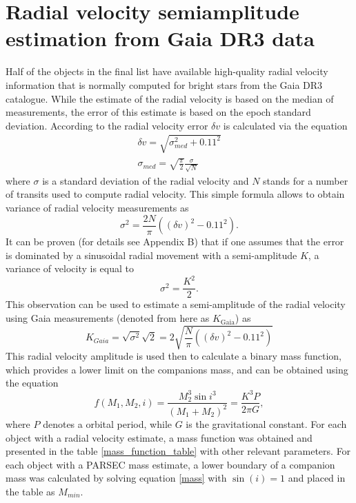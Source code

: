 \documentclass{pracalicmgr}
\begin{document}
\section{Radial velocity semiamplitude estimation from Gaia DR3 data}
Half of the objects in the final list have available high-quality radial velocity information that is normally computed for bright stars from the Gaia DR3 catalogue.
While the estimate of the radial velocity is based on the median of measurements, 
the error of this estimate is based on the epoch standard deviation. According to \citet{katz_gaia_2022} the radial velocity error $\delta v$ 
is calculated via the equation
\begin{align}
    \delta v=\sqrt{\sigma_{med}^2+0.11^2}\\
    \sigma_{med}=\sqrt{\frac{\pi}{2}}\frac{\sigma}{\sqrt{N}}
\end{align}
where $\sigma$ is a standard deviation of the radial velocity and $N$ stands for a number of transits used to compute radial velocity. This simple formula allows to obtain variance of 
radial velocity measurements as 
\begin{equation}
    \sigma^2=\frac{2N}{\pi}\left((\delta v)^2-0.11^2\right).
\end{equation}
It can be proven (for details see Appendix B) that if one assumes that the error is dominated by a sinusoidal radial movement with a semi-amplitude $K$,
a variance of velocity is equal to
\begin{equation}
    \sigma^2=\frac{K^2}{2}.
\end{equation}
This observation can be used to estimate a semi-amplitude of the radial velocity using Gaia measurements (denoted from here as $K_{\textrm{Gaia}}$) as 
\begin{equation}
    K_{Gaia}=\sqrt{\sigma^2}\sqrt{2}=2\sqrt{\frac{N}{\pi}\left((\delta v)^2-0.11^2\right)}
\end{equation}
This radial velocity amplitude is used then to calculate a binary mass function, which provides a lower limit on the companions mass, and can be obtained using the equation
\begin{equation}\label{mass}
    f(M_1,M_2,i)=\frac{M_2^3 \sin{i}^3}{(M_1+M_2)^2}=\frac{K^3 P}{2\pi G},
\end{equation}
where $P$ denotes a orbital period, while $G$ is the gravitational constant. For each object with a radial velocity estimate, a mass function was obtained
and presented in the table \ref{mass_function_table} with other relevant parameters.
For each object with a PARSEC mass estimate, a lower boundary of a companion mass was calculated by solving equation \ref{mass}
with $\sin{(i)}=1$ and placed in the table as $M_{min}$.
\end{document}
